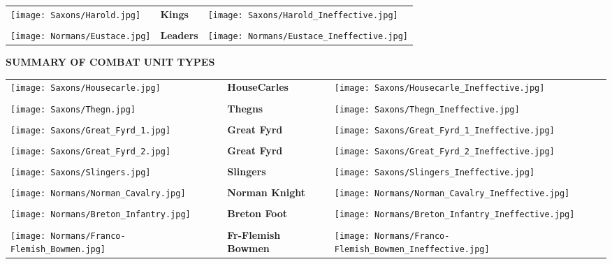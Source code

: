 \begin{tabularx}{0.5\textwidth}{
    >{\raggedright\arraybackslash}X
    >{\centering\arraybackslash}X
    >{\raggedleft\arraybackslash}X}
    \texttt{[image: Saxons/Harold.jpg]} &
    \textbf{Kings} &
    \texttt{[image: Saxons/Harold\_Ineffective.jpg]} \\ \\
    \texttt{[image: Normans/Eustace.jpg]} &
    \textbf{Leaders} &
    \texttt{[image: Normans/Eustace\_Ineffective.jpg]}
\end{tabularx}

\par
\begin{center}
  \textbf{SUMMARY OF COMBAT UNIT TYPES}
  \break
\end{center}

\begin{tabularx}{0.5\textwidth}{
    >{\raggedright\arraybackslash}X
    >{\centering\arraybackslash}X
    >{\raggedleft\arraybackslash}X}

  \texttt{[image: Saxons/Housecarle.jpg]} & \textbf{HouseCarles} & \texttt{[image: Saxons/Housecarle\_Ineffective.jpg]} \\ \\
  \texttt{[image: Saxons/Thegn.jpg]} & \textbf{Thegns} & \texttt{[image: Saxons/Thegn\_Ineffective.jpg]} \\ \\
  \texttt{[image: Saxons/Great\_Fyrd\_1.jpg]} & \textbf{Great Fyrd} & \texttt{[image: Saxons/Great\_Fyrd\_1\_Ineffective.jpg]} \\ \\
  \texttt{[image: Saxons/Great\_Fyrd\_2.jpg]} & \textbf{Great Fyrd} & \texttt{[image: Saxons/Great\_Fyrd\_2\_Ineffective.jpg]} \\ \\
  \texttt{[image: Saxons/Slingers.jpg]} & \textbf{Slingers} & \texttt{[image: Saxons/Slingers\_Ineffective.jpg]} \\ \\
  \texttt{[image: Normans/Norman\_Cavalry.jpg]} & \textbf{Norman Knight} & \texttt{[image: Normans/Norman\_Cavalry\_Ineffective.jpg]} \\ \\
  \texttt{[image: Normans/Breton\_Infantry.jpg]} & \textbf{Breton Foot} & \texttt{[image: Normans/Breton\_Infantry\_Ineffective.jpg]} \\ \\
  \texttt{[image: Normans/Franco-Flemish\_Bowmen.jpg]} & \textbf{Fr-Flemish Bowmen} & \texttt{[image: Normans/Franco-Flemish\_Bowmen\_Ineffective.jpg]}
\end{tabularx}


